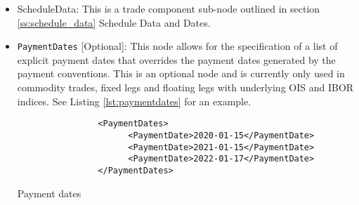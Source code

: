 \begin{itemize}
\item ScheduleData: This is a trade component sub-node outlined in section \ref{ss:schedule_data} Schedule Data and
Dates.
\item \lstinline!PaymentDates! [Optional]: This node allows for the specification of a list of explicit payment dates that overrides the payment dates generated by the payment conventions. This is an optional node and is currently only used in commodity trades, fixed legs and floating legs with underlying OIS and IBOR indices.
See Listing \ref{lst:paymentdates} for an example. \break

\begin{listing}[H]
\begin{verbatim}
                <PaymentDates>
                      <PaymentDate>2020-01-15</PaymentDate>
                      <PaymentDate>2021-01-15</PaymentDate>
                      <PaymentDate>2022-01-17</PaymentDate>
                </PaymentDates>
\end{verbatim}
\caption{Payment dates}
\label{lst:paymentdates}
\end{listing}


\end{itemize}
